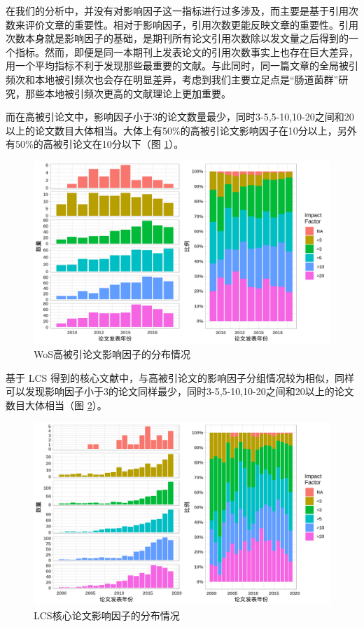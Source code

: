 \documentclass[]{ctexbook}
\begin{document}
在我们的分析中，并没有对影响因子这一指标进行过多涉及，而主要是基于引用次数来评价文章的重要性。相对于影响因子，引用次数更能反映文章的重要性。引用次数本身就是影响因子的基础，是期刊所有论文引用次数除以发文量之后得到的一个指标。然而，即便是同一本期刊上发表论文的引用次数事实上也存在巨大差异，用一个平均指标不利于发现那些最重要的文献。与此同时，同一篇文章的全局被引频次和本地被引频次也会存在明显差异，考虑到我们主要立足点是``肠道菌群''研究，那些本地被引频次更高的文献理论上更加重要。

而在高被引论文中，影响因子小于3的论文数量最少，同时3-5,5-10,10-20之间和20以上的论文数目大体相当。大体上有50\%的高被引论文影响因子在10分以上，另外有50\%的高被引论文在10分以下（图 \ref{fig:HC-article-group-by-IF}）。

\begin{figure}
\includegraphics[width=1\linewidth]{plots/HC-article-group-by-IF-1} \caption{WoS高被引论文影响因子的分布情况}\label{fig:HC-article-group-by-IF}
\end{figure}

基于 LCS 得到的核心文献中，与高被引论文的影响因子分组情况较为相似，同样可以发现影响因子小于3的论文同样最少，同时3-5,5-10,10-20之间和20以上的论文数目大体相当（图 \ref{fig:LCS-core-article-group-by-IF}）。

\begin{figure}
\includegraphics[width=1\linewidth]{plots/LCS-core-article-group-by-IF-1} \caption{LCS核心论文影响因子的分布情况}\label{fig:LCS-core-article-group-by-IF}
\end{figure}
\end{document}
